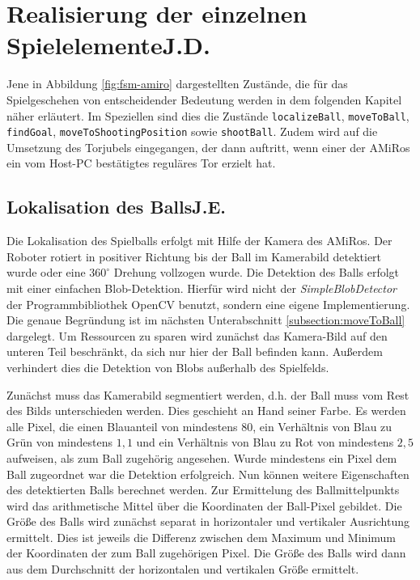 \section[Realisierung der einzelnen Spielelemente]{Realisierung der einzelnen Spielelemente\hfill {\normalsize J.D.}}

Jene in Abbildung \ref{fig:fsm-amiro} dargestellten Zustände, die für das Spielgeschehen von entscheidender Bedeutung werden in dem folgenden Kapitel näher erläutert. Im Speziellen sind dies die Zustände \texttt{localizeBall}, \texttt{moveToBall}, \texttt{findGoal}, \texttt{moveToShooting\-Position} sowie \texttt{shootBall}. Zudem wird auf die Umsetzung des Torjubels eingegangen, der dann auftritt, wenn einer der AMiRos ein vom Host-PC bestätigtes reguläres Tor erzielt hat.

\subsection[Lokalisation des Balls]{Lokalisation des Balls\hfill {\normalsize J.E.}} %
\label{subsection:locateBall}

Die Lokalisation des Spielballs erfolgt mit Hilfe der Kamera des AMiRos. Der Roboter rotiert in positiver Richtung bis der Ball im Kamerabild detektiert wurde oder eine $360^\circ$ Drehung vollzogen wurde. Die Detektion des Balls erfolgt mit einer einfachen Blob-Detektion. Hierfür wird nicht der \textit{SimpleBlobDetector} der Programmbibliothek OpenCV benutzt, sondern eine eigene Implementierung. Die genaue Begründung ist im nächsten Unterabschnitt \ref{subsection:moveToBall} dargelegt. Um Ressourcen zu sparen wird zunächst das Kamera-Bild auf den unteren Teil beschränkt, da sich nur hier der Ball befinden kann. Außerdem verhindert dies die Detektion von Blobs außerhalb des Spielfelds.

Zunächst muss das Kamerabild segmentiert werden, d.h. der Ball muss vom Rest des Bilds unterschieden werden.
Dies geschieht an Hand seiner Farbe. Es werden alle Pixel, die einen Blauanteil von mindestens 80, ein Verhältnis von Blau zu Grün von mindestens $1,1$ und ein Verhältnis von Blau zu Rot von mindestens $2,5$ aufweisen, als zum Ball zugehörig angesehen.
Wurde mindestens ein Pixel dem Ball zugeordnet war die Detektion erfolgreich. Nun können weitere Eigenschaften des detektierten Balls berechnet werden.
Zur Ermittelung des Ballmittelpunkts wird das arithmetische Mittel über die Koordinaten der Ball-Pixel gebildet.
Die Größe des Balls wird zunächst separat in horizontaler und vertikaler Ausrichtung ermittelt. Dies ist jeweils die Differenz zwischen dem Maximum und Minimum der Koordinaten der zum Ball zugehörigen Pixel. Die Größe des Balls wird dann aus dem Durchschnitt der horizontalen und vertikalen Größe ermittelt.


